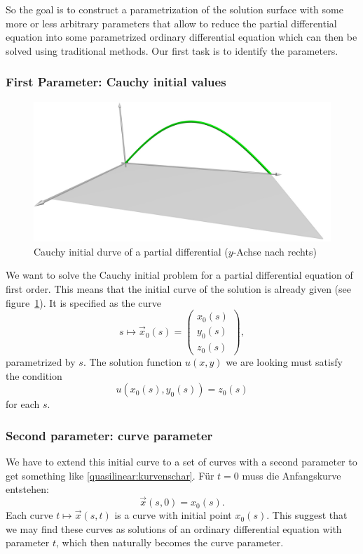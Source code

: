 So the goal is to construct a parametrization of the solution surface
with some more or less arbitrary parameters that allow to reduce the
partial differential equation into some parametrized ordinary
differential equation which can then be solved using traditional methods.
Our first task is to identify the parameters.

\subsubsection{First Parameter: Cauchy initial values}
\begin{figure}
\begin{center}
\includegraphics[width=\hsize]{../common/3d/cauchy.jpg}
\end{center}
\caption{Cauchy initial durve of a partial differential
($y$-Achse nach rechts)
\label{geometrie:cauchy-anfangskurve}}
\end{figure}
We want to solve the Cauchy initial problem for a partial differential
equation of first order.
This means that the initial curve of the solution is already given
(see figure~\ref{geometrie:cauchy-anfangskurve}).
It is specified as the curve
\begin{equation}
s\mapsto\vec x_0(s)=\begin{pmatrix}
x_0(s)\\
y_0(s)\\
z_0(s)
\end{pmatrix},
\label{quasilinear:anfangskurve}
\end{equation}
parametrized by $s$.
The solution function $u(x,y)$ we are looking must satisfy
the condition
\[
u(x_0(s), y_0(s))=z_0(s)
\]
for each $s$.

\subsubsection{Second parameter: curve parameter}
We have to extend this initial curve to a set of curves with a
second parameter to get something like \eqref{quasilinear:kurvenschar}.
Für $t=0$ muss die Anfangskurve entstehen:
\[
\vec x(s,0)=x_0(s).
\]
Each curve $t\mapsto \vec x(s,t)$ is a curve with initial point $x_0(s)$.
This suggest that we may find these curves as solutions of an ordinary
differential equation with parameter $t$, which then naturally becomes
the curve parameter.

